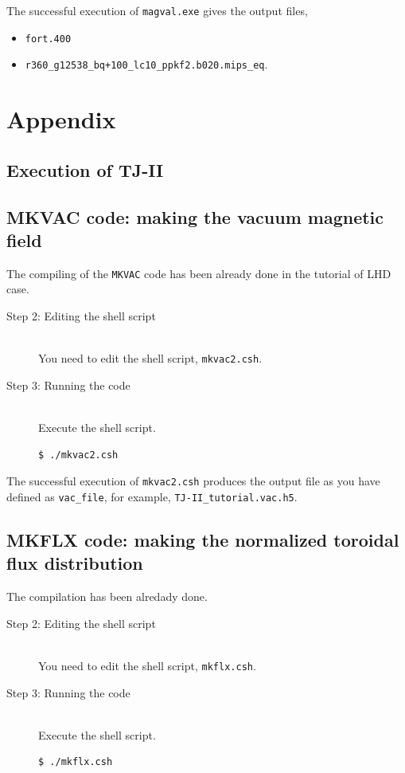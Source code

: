 \documentclass[10pt]{ltxdoc} %
\begin{document}
The successful execution of \texttt{magval.exe} gives the output files, 
\begin{itemize}
    \item \texttt{fort.400}
    \item \texttt{r360\_g12538\_bq+100\_lc10\_ppkf2.b020.mips\_eq}. 
\end{itemize}


\section{Appendix}
\subsection{Execution of TJ-II}
\subsection{MKVAC code: making the vacuum magnetic field}

The compiling of the \texttt{MKVAC} code has been already done in the tutorial of LHD case. 
\begin{description}
 \item[Step 2: Editing the shell script]\mbox{}\\
  You need to edit the shell script, \texttt{mkvac2.csh}. 

 \item[Step 3: Running the code]\mbox{}\\
  Execute the shell script.
\vspace{-2mm}
\begin{verbatim}
$ ./mkvac2.csh
\end{verbatim}
\vspace{-2mm}
\end{description}

The successful execution of \texttt{mkvac2.csh} produces the output file as you have defined as \texttt{vac\_file}, for example, \texttt{TJ-II\_tutorial.vac.h5}. 



\subsection{MKFLX code: making the normalized toroidal flux distribution}
The compilation has been alredady done. 
\begin{description}


 \item[Step 2: Editing the shell script]\mbox{}\\
  You need to edit the shell script, \texttt{mkflx.csh}. 

 \item[Step 3: Running the code]\mbox{}\\
  Execute the shell script.
\vspace{-2mm}
\begin{verbatim}
$ ./mkflx.csh
\end{verbatim}
\vspace{-2mm}
\end{description}
\end{document}
